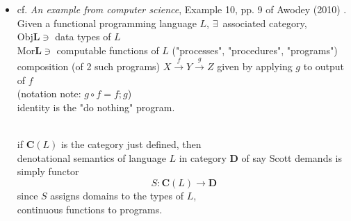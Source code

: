 \documentclass[10pt]{amsart}
\begin{document}
\begin{multicols*}{2}
\begin{itemize}
$\text{Mor}\textbf{Pos} = \bigcup_{A, B \in \text{Obj}(\textbf{Pos}) } \text{ monotone functions $A \to B$ }$  

\quad \\ 
A \emph{poset} is a \emph{preorder}, satisfying additional condition of antisymmetry:
if $a\leq b$, and $b\leq a$, $a=b$. \\
e.g. $\forall \, X$, power set $P(X)$ is a poset under inclusion $U\subseteq V$, $\forall \, $ subsets $U,V \subseteq X$.

\begin{itemize}
	\item cf. Ch. 1, Example 8, pp. 9, Awodey (2010) \cite{Awod2010}.
	$\textbf{Pos}$ categories and functors: functor $F: \mathbf{D} \to \mathbf{Q}$ between poset categories $\mathbf{P}, \mathbf{Q}$. \\
	They are the monotone functions.
	\begin{proof} 
	Consider 
	\[
	F : \text{Hom}_{\mathbf{P}}(A,B) \to \text{Hom}_{\mathbf{Q}}(F(A), F(B))
	\]
	$f\in \text{Hom}_{\mathbf{P}}(A,B)$ so if $a\leq_A a'$, $f(a) \leq_B f(a')$
	
	Let $g\in \text{Hom}_{\mathbf{Q}}(F(A), F(B))$, so if $c\leq_{F(A)} c'$, $g(c)\leq_{F(B)} g(c')$. \\
	
	$F(f) \in \text{Hom}_{\mathbf{Q}}(F(A), F(B))$ (by definition of a functor), so if $c\leq_{F(A)} c'$, $F(f)(c) \leq_{F(B)} F(f)(c')$ or $F(f(c)) \leq_{F(B)} F(f(c'))$. \\
	
	So $F$ itself is monotone.
	\end{proof}
\end{itemize}
\item cf. \emph{An example from computer science}, Example 10, pp. 9 of Awodey (2010) \cite{Awod2010}.
Given a functional programming language $L$, $\exists \, $ associated category, \\
$\text{Obj}\mathbf{L} \ni $ data types of $L$ \\
$\text{Mor}\mathbf{L} \ni $ computable functions of $L$ ("processes", "procedures", "programs") \\
composition (of 2 such programs) $X \xrightarrow{f} Y \xrightarrow{g} Z$ given by applying $g$ to output of $f$ \\
(notation note: $g\circ f = f; g$) \\
identity is the "do nothing" program. 

\quad \\
if $\mathbf{C}(L)$ is the category just defined, then \\
denotational semantics of language $L$ in category $\mathbf{D}$ of say Scott demands is simply functor
\[
S:\mathbf{C}(L) \to \mathbf{D} 
\]
since $S$ assigns domains to the types of $L$, \\
continuous functions to programs.


\end{itemize}
\end{multicols*}
\end{document}
